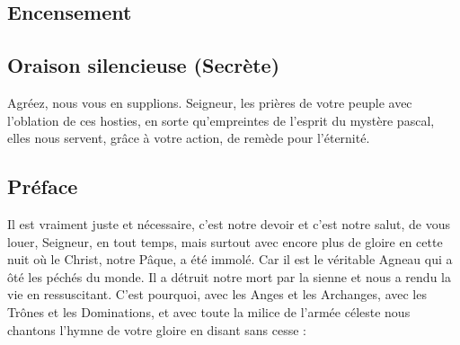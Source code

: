 \documentclass[%
fontsize=12%
,a5paper%
,DIV=15%
]{scrartcl}
\begin{document}
\subsection*{Encensement}


\subsection*{%
Oraison silencieuse (Secrète)%
}
Agréez, nous vous en supplions. Seigneur, les prières de votre peuple avec l’oblation de ces hosties, en sorte qu’empreintes de l’esprit du mystère pascal, elles nous servent, grâce à votre action, de remède pour l’éternité.


\subsection*{%
Préface%
}








Il est vraiment juste et nécessaire,
c’est notre devoir et c’est notre salut,
de vous louer, Seigneur, en tout temps,
mais surtout avec encore plus de gloire en cette nuit
où le Christ, notre Pâque, a été immolé.
Car il est le véritable Agneau
qui a ôté les péchés du monde.
Il a détruit notre mort par la sienne
et nous a rendu la vie en ressuscitant.
C’est pourquoi, avec les Anges et les Archanges,
avec les Trônes et les Dominations,
et avec toute la milice de l’armée céleste
nous chantons l’hymne de votre gloire
en disant sans cesse :
\end{document}
